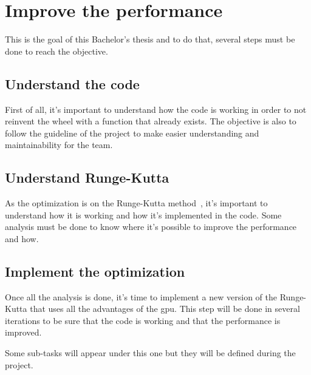 \section{Improve the performance}
\label{spec:ch:activities:improve-the-performance}

This is the goal of this Bachelor's thesis and to do that, several steps must be done to reach the objective.


\subsection{Understand the code}
\label{spec:ch:activities:improve-the-performance:understand-the-code}

First of all, it's important to understand how the code is working in order to not reinvent the wheel with a function that already exists.
The objective is also to follow the guideline of the project to make easier understanding and maintainability for the team.


\subsection{Understand Runge-Kutta}
\label{spec:ch:activities:improve-the-performance:understand-runge-kutta}

As the optimization is on the Runge-Kutta method~\cite{Runge-Kutta-methods}, it's important to understand how it is working and how it's implemented in the code.
Some analysis must be done to know where it's possible to improve the performance and how.


\subsection{Implement the optimization}
\label{spec:ch:activities:improve-the-performance:implement-the-optimization}

Once all the analysis is done, it's time to implement a new version of the Runge-Kutta that uses all the advantages of the \acrshort{gpu}.
This step will be done in several iterations to be sure that the code is working and that the performance is improved.

Some sub-tasks will appear under this one but they will be defined during the project.

